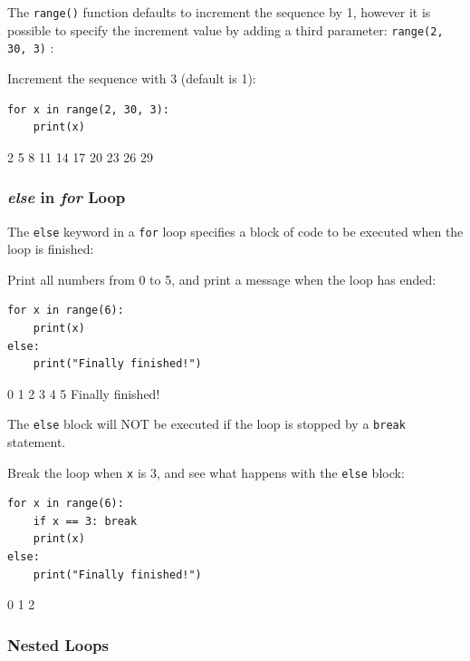 \documentclass[12pt,a4paper]{article}
\newcommand{\code}[1]{%
	\colorbox{backcolour}{\lstinline{#1}}%
}
\newcommand{\lcode}[1]{%
	\lstinline{#1}%
}
\begin{document}
The \code{range()} function defaults to increment the sequence by 1, however it
is possible to specify the increment value by adding a third parameter:
\code{range(2, 30, 3)}:

\begin{ebox}
Increment the sequence with 3 (default is 1):
	\begin{lstlisting}
for x in range(2, 30, 3):
    print(x)
	\end{lstlisting}
\tcblower
	\begin{vercode}
2
5
8
11
14
17
20
23
26
29
	\end{vercode}
\end{ebox}
\subsubsection{\textit{else} in \textit{for} Loop}

The \code{else} keyword in a \code{for} loop specifies a block of code to be
executed when the loop is finished:

\begin{ebox}
Print all numbers from 0 to 5, and print a message when the loop has ended:
	\begin{lstlisting}
for x in range(6):
    print(x)
else:
    print("Finally finished!")
	\end{lstlisting}
\tcblower
	\begin{vercode}
0
1
2
3
4
5
Finally finished!
	\end{vercode}
\end{ebox}

\begin{nbox}
The \lcode{else} block will NOT be executed if the loop is stopped by a
\lcode{break} statement.
\end{nbox}

\begin{ebox}
Break the loop when \lcode{x} is 3, and see what happens with the \lcode{else} block:
	\begin{lstlisting}
for x in range(6):
    if x == 3: break
    print(x)
else:
    print("Finally finished!")
	\end{lstlisting}
\tcblower
	\begin{vercode}
0
1
2
	\end{vercode}
\end{ebox}
\subsubsection{Nested Loops}
\end{document}

